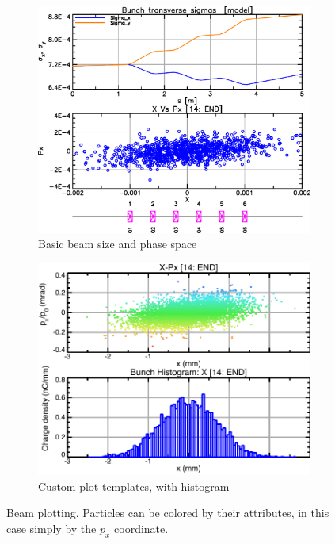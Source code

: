 \documentclass{hitec}     %
\begin{document}
{%
\begin{figure}[tb]
  \centering
  \begin{subfigure}[t]{.45\textwidth}
    \includegraphics[width=\textwidth]{beam-tracking.pdf}
    \caption{Basic beam size and phase space}
    \label{f:beam-tracking}
  \end{subfigure}
  \hfil
  \begin{subfigure}[t]{0.49\textwidth}
    \includegraphics[width=\textwidth]{beam-tracking-fancy.pdf}
    \caption{Custom plot templates, with histogram}
    \label{f:beam-tracking-fancy}
  \end{subfigure}
  \caption{Beam plotting. Particles can be colored by their attributes, in this case simply by the $p_x$ coordinate.  }
\end{figure}

}
\end{document}
